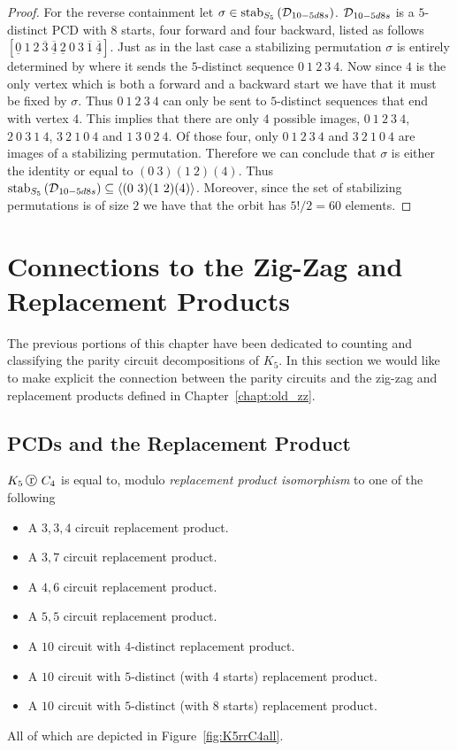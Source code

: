 \begin{proof}
For the reverse containment let $\sigma \in \operatorname{\mathrm{stab}}_{S_5}\left(\operatorname{\mathcal{D}}_{10-5d8s} \right)$. $\operatorname{\mathcal{D}}_{10-5d8s}$ is a $5$-distinct PCD with $8$ starts, four forward and four backward, listed as follows $[\underline{0}\ 1\ 2\ \overline{3}\ \underline{\overline{4}}\ \underline{2}\ 0\ 3\ \overline{1}\ \underline{\overline{4}}]$. Just as in the last case a stabilizing permutation $\sigma$ is entirely determined by where it sends the $5$-distinct sequence $0\ 1\ 2\ 3\ 4$. Now since $4$ is the only vertex which is both a forward and a backward start we have that it must be fixed by $\sigma$. Thus $0 \ 1\ 2\ 3\ 4$ can only be sent to $5$-distinct sequences that end with vertex $4$. This implies that there are only $4$ possible images, $0\ 1\ 2\ 3\ 4$, $2\ 0\ 3\ 1\ 4$, $3\ 2\ 1\ 0\ 4$ and $1\ 3\ 0\ 2\ 4$. Of those four, only $0\ 1\ 2\ 3\ 4$ and $3\ 2\ 1\ 0\ 4$ are images of a stabilizing permutation. Therefore we can conclude that $\sigma$ is either the identity or equal to $(0\ 3)(1\ 2)(4)$. Thus $\operatorname{\mathrm{stab}}_{S_5}\left(\operatorname{\mathcal{D}}_{10-5d8s} \right) \subseteq \left<(0\ 3)(1\ 2)(4) \right>$. Moreover, since the set of stabilizing permutations is of size $2$ we have that the orbit has $5!/2 = 60$ elements. 
\end{proof}

\section{Connections to the Zig-Zag and Replacement Products}
\label{sec:pcd_zz_rr}


The previous portions of this chapter have been dedicated to counting and classifying the parity circuit decompositions of $K_5$. In this section we would like to make explicit the connection between the parity circuits and the zig-zag and replacement products defined in Chapter~\ref{chapt:old_zz}.

\subsection{PCDs and the Replacement Product}
\label{sec:cloud-circ-repl}


\begin{theorem}
  \label{thm:replacement_cats}
$K_5 \replacement C_4$  is equal to, modulo {\em replacement product isomorphism} to one of the following
\begin{itemize}
\item A $3,3,4$ circuit replacement product.
\item A $3,7$ circuit replacement product. 
\item A $4,6$ circuit replacement product.
\item A $5,5$ circuit replacement product.
\item A $10$ circuit with $4$-distinct replacement product.
\item A $10$ circuit with $5$-distinct (with 4 starts) replacement product.
\item A $10$ circuit with $5$-distinct (with 8 starts) replacement product. 
\end{itemize}
All of which are depicted in Figure~\ref{fig:K5rrC4all}.
\end{theorem}

